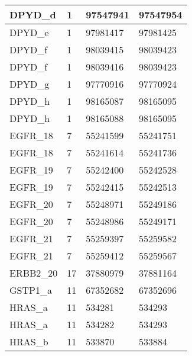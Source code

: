 \begin{longtable}{| p{} | C{.10\textwidth} | C{.35\textwidth} | C{.35\textwidth} |}
DPYD\_d                 & 1            & 97547941              & 97547954            \\ \hline
DPYD\_e                 & 1            & 97981417              & 97981425            \\ \hline
DPYD\_f                 & 1            & 98039415              & 98039423            \\ \hline
DPYD\_f                 & 1            & 98039416              & 98039423            \\ \hline
DPYD\_g                 & 1            & 97770916              & 97770924            \\ \hline
DPYD\_h                 & 1            & 98165087              & 98165095            \\ \hline
DPYD\_h                 & 1            & 98165088              & 98165095            \\ \hline
EGFR\_18                & 7            & 55241599              & 55241751            \\ \hline
EGFR\_18                & 7            & 55241614              & 55241736            \\ \hline
EGFR\_19                & 7            & 55242400              & 55242528            \\ \hline
EGFR\_19                & 7            & 55242415              & 55242513            \\ \hline
EGFR\_20                & 7            & 55248971              & 55249186            \\ \hline
EGFR\_20                & 7            & 55248986              & 55249171            \\ \hline
EGFR\_21                & 7            & 55259397              & 55259582            \\ \hline
EGFR\_21                & 7            & 55259412              & 55259567            \\ \hline
ERBB2\_20               & 17           & 37880979              & 37881164            \\ \hline
GSTP1\_a                & 11           & 67352682              & 67352696            \\ \hline
HRAS\_a                 & 11           & 534281                & 534293              \\ \hline
HRAS\_a                 & 11           & 534282                & 534293              \\ \hline
HRAS\_b                 & 11           & 533870                & 533884              \\ \hline

\end{longtable}
